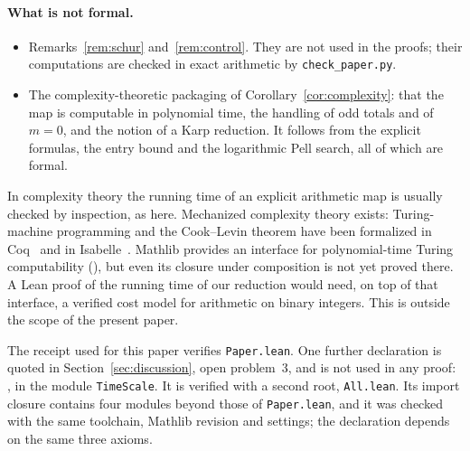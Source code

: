 \documentclass[11pt,a4paper]{article}
\theoremstyle{plain}
\theoremstyle{definition}
\theoremstyle{remark}
\begin{document}
\paragraph{What is not formal.}
\begin{itemize}
\item Remarks~\ref{rem:schur} and~\ref{rem:control}. They are not used in the proofs; their
computations are checked in exact arithmetic by \texttt{check\_paper.py}.
\item The complexity-theoretic packaging of Corollary~\ref{cor:complexity}: that the map is
computable in polynomial time, the handling of odd totals and of $m=0$, and the notion of
a Karp reduction. It follows from the explicit formulas, the entry bound and the
logarithmic Pell search, all of which are formal.
\end{itemize}
In complexity theory the running time of an explicit arithmetic map is usually checked
by inspection, as here. Mechanized complexity theory exists: Turing-machine programming
and the Cook--Levin theorem have been formalized in Coq~\cite{forster2020,gaher2021} and
in Isabelle~\cite{balbach2023}. Mathlib provides an interface for polynomial-time Turing
computability (), but even its closure under
composition is not yet proved there. A Lean proof of the running time of our reduction
would need, on top of that interface, a verified cost model for arithmetic on binary
integers. This is outside the scope of the present paper.

The receipt used for this paper verifies \texttt{Paper.lean}. One further declaration is
quoted in Section~\ref{sec:discussion}, open problem~3, and is not used in any proof:
, in the module \texttt{TimeScale}. It is verified with a
second root, \texttt{All.lean}. Its import closure contains four modules beyond those of
\texttt{Paper.lean}, and it was checked with the same toolchain, Mathlib revision and
settings; the declaration depends on the same three axioms.
\end{document}
